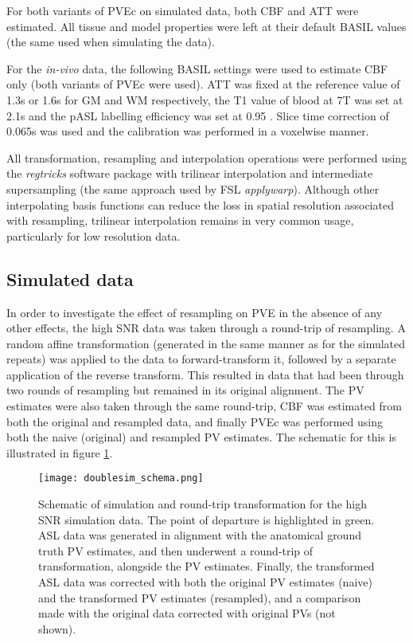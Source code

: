 For both variants of PVEc on simulated data, both CBF and ATT were estimated. All tissue and model properties were left at their default BASIL values (the same used when simulating the data). 

For the \textit{in-vivo} data, the following BASIL settings were used to estimate CBF only (both variants of PVEc were used). ATT was fixed at the reference value of 1.3s or 1.6s for GM and WM respectively, the T1 value of blood at 7T was set at 2.1s and the pASL labelling efficiency was set at 0.95 \cite{Zhang2013}. Slice time correction of 0.065s was used and the calibration was performed in a voxelwise manner. 

All transformation, resampling and interpolation operations were performed using the \textit{regtricks} software package \cite{regtricks} with trilinear interpolation and intermediate supersampling (the same approach used by FSL \textit{applywarp}). Although other interpolating basis functions can reduce the loss in spatial resolution associated with resampling, trilinear interpolation remains in very common usage, particularly for low resolution data. 

\subsection{Simulated data}
\label{pvec_simulation_data_section}

In order to investigate the effect of resampling on PVE in the absence of any other effects, the high SNR data was taken through a round-trip of resampling. A random affine transformation (generated in the same manner as for the simulated repeats) was applied to the data to forward-transform it, followed by a separate application of the reverse transform. This resulted in data that had been through two rounds of resampling but remained in its original alignment. The PV estimates were also taken through the same round-trip, CBF was estimated from both the original and resampled data, and finally PVEc was performed using both the naive (original) and resampled PV estimates. The schematic for this is illustrated in figure \ref{doublesim_schema}. 

\begin{figure}[h]
\centering
\texttt{[image: doublesim\_schema.png]}
\caption{Schematic of simulation and round-trip transformation for the high SNR simulation data. The point of departure is highlighted in green. ASL data was generated in alignment with the anatomical ground truth PV estimates, and then underwent a round-trip of transformation, alongside the PV estimates. Finally, the transformed ASL data was corrected with both the original PV estimates (naive) and the transformed PV estimates (resampled), and a comparison made with the original data corrected with original PVs (not shown).}
\label{doublesim_schema}
\end{figure}

